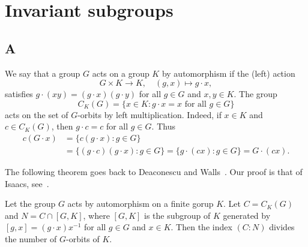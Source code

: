 \chapter{Invariant subgroups}

\label{invariant}

\section*{A}

We say that a group $G$ acts on a group $K$ by automorphism if the (left) action
\[
G\times K\to K,
\quad
(g,x)\mapsto g\cdot x,
\]
satisfies $g\cdot (xy)=(g\cdot x)(g\cdot y)$ 
for all $g\in G$ and $x,y\in K$. 
The group 
\[
C_{K}(G)=\{x\in K:g\cdot x=x\text{ for all }g\in G\}
\]
acts on the 
set of $G$-orbits by left multiplication. Indeed, if $x\in K$ and $c\in C_K(G)$, then $g\cdot c=c$ for all $g\in G$. Thus  
\begin{align*}
  c(G\cdot x)
  &=\{c(g\cdot x):g\in G\}\\
  &=\{(g\cdot c)(g\cdot x):g\in G\}
  =\{g\cdot (cx):g\in G\}
  =G\cdot (cx).
\end{align*}

The following theorem goes back to Deaconescu and Walls~\cite{MR2164558}. 
Our proof is that of Isaacs, see~\cite{MR2922681}. 

\begin{theorem}
	\label{thm:DeaconescuWalls}
	Let the group $G$ acts by automorphism on a finite gorup $K$. Let
	$C=C_{K}(G)$ and $N=C\cap [G,K]$,
	where $[G,K]$ is the subgroup of $K$ generated by $[g,x]=(g\cdot x)x^{-1}$ for all
	$g\in G$ and $x\in K$. Then the index $(C:N)$ divides the number of $G$-orbits of 
	$K$. 
\end{theorem}

%

